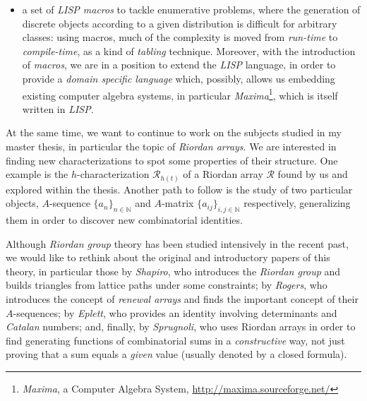 \begin{itemize}
\begin{itemize}
            \item a set of \emph{LISP macros} to tackle enumerative problems,
            where the generation of discrete objects according to a given
            distribution is difficult for arbitrary classes: using macros, much
            of the complexity is moved from \emph{run-time} to
            \emph{compile-time}, as a kind of \emph{tabling} technique.
            Moreover, with the introduction of \emph{macros}, we are in a
            position to extend the \emph{LISP} language, in order to provide a
            \emph{domain specific language} which, possibly, allows us
            embedding existing computer algebra systems, in particular
            \emph{Maxima}\footnote{\emph{Maxima}, a Computer Algebra System,
            \url{http://maxima.sourceforge.net/}}, which is itself written in
            \emph{LISP}.

        \end{itemize}
\end{itemize}

At the same time, we want to continue to work on the subjects studied in my
master thesis, in particular the topic of \emph{Riordan arrays}. We are
interested in finding new characterizations to spot some properties of their
structure. One example is the $h$-characterization $\mathcal{R}_{h(t)}$ of a
Riordan array $\mathcal{R}$ found by us and explored within the thesis.
Another path to follow is the study of two particular objects, $A$-sequence
$\lbrace a_{n}\rbrace_{n\in\mathbb{N}}$ and $A$-matrix $\lbrace
a_{ij}\rbrace_{i,j\in\mathbb{N}}$ respectively, generalizing them in order to
discover new combinatorial identities.%

Although \emph{Riordan group} theory has been studied intensively in the recent past, we would
like to rethink about the original and introductory papers of this theory, in
particular those by \emph{Shapiro}, who introduces the \emph{Riordan group} and
builds triangles from lattice paths under some constraints; by \emph{Rogers},
who introduces the concept of \emph{renewal arrays} and finds the important
concept of their $A$-sequences; by \emph{Eplett}, who provides an identity
involving determinants and \emph{Catalan} numbers; and, finally, by
\emph{Sprugnoli}, who uses Riordan arrays in order to find generating
functions of combinatorial sums in a \emph{constructive} way, not just proving
that a sum equals a \emph{given} value (usually denoted by a closed formula). 

